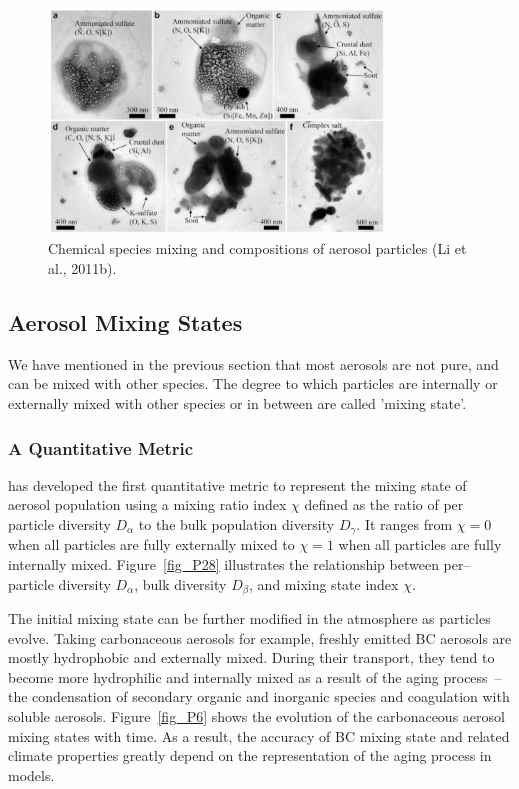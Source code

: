 \documentclass[12pt, fullpage]{uiucthesis2009}
\begin{document}
		\begin{figure}[h] 
			\begin{center}
				\includegraphics[width = 0.8\textwidth]{Figure05}
				\caption[Chemical species mixing and compositions of aerosol particles, taken from the . (Li et al., 2011b)]{\label{fig_P5} Chemical species mixing and compositions of aerosol particles (Li et al., 2011b).}
			\end{center}
		\end{figure}
	
	
	\subsection{Aerosol Mixing States}
	We have mentioned in the previous section that most aerosols are not pure, and can be mixed with other species. The degree to which particles are internally or externally mixed with other species or in between are called 'mixing state'.  

	\subsubsection{A Quantitative Metric}
	\citet{Riemer2013} has developed the first quantitative metric to represent the mixing state of aerosol population using a mixing ratio index $\chi$ defined as the ratio of per particle diversity $D_{\alpha}$ to the bulk population diversity $D_{\gamma}$. It ranges from $\chi = 0$ when all particles are fully externally mixed to $\chi = 1$ when all particles are fully internally mixed. Figure~\ref{fig_P28} illustrates the relationship between per--particle diversity $D_{\alpha}$, bulk diversity $D_{\beta}$, and mixing state index $\chi$.
	
	The initial mixing state can be further modified in the atmosphere as particles evolve. Taking carbonaceous aerosols for example, freshly emitted BC aerosols are mostly hydrophobic and externally mixed. During their transport, they tend to become more hydrophilic and internally mixed as a result of the aging process~--the condensation of secondary organic and inorganic species and coagulation with soluble aerosols. Figure~\ref{fig_P6} shows the evolution of the carbonaceous aerosol mixing states with time. As a result, the accuracy of BC mixing state and related climate properties greatly depend on the representation of the aging process in models.
	
\end{document}
